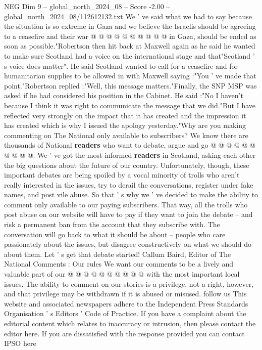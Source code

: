 \begin{textsample}{NEG Dim 9 – global\_north\_2024\_08 – Score -2.00 – global\_north\_2024\_08/112612132.txt}
We ' ve said what we had to say because the situation is so extreme in Gaza and we believe the Israelis should be agreeing to a ceasefire and their war @ @ @ @ @ @ @ @ @ @ in Gaza, should be ended as soon as possible."Robertson then hit back at Maxwell again as he said he wanted to make sure Scotland had a voice on the international stage and that"Scotland ' s voice does matter".
He said Scotland wanted to call for a ceasefire and for humanitarian supplies to be allowed in with Maxwell saying :"You ' ve made that point."Robertson replied :"Well, this message matters."Finally, the SNP MSP was asked if he had considered his position in the Cabinet.
He said :"No I haven't because I think it was right to communicate the message that we did."But I have reflected very strongly on the impact that it has created and the impression it has created which is why I issued the apology yesterday."Why are you making commenting on The National only available to subscribers?
We know there are thousands of National \textbf{readers} who want to debate, argue and go @ @ @ @ @ @ @ @ @ @.
We ' ve got the most informed \textbf{readers} in Scotland, asking each other the big questions about the future of our country.
Unfortunately, though, these important debates are being spoiled by a vocal minority of trolls who aren't really interested in the issues, try to derail the conversations, register under fake names, and post vile abuse.
So that ' s why we ' ve decided to make the ability to comment only available to our paying subscribers.
That way, all the trolls who post abuse on our website will have to pay if they want to join the debate -- and risk a permanent ban from the account that they subscribe with.
The conversation will go back to what it should be about -- people who care passionately about the issues, but disagree constructively on what we should do about them.
Let ' s get that debate started!
Callum Baird, Editor of The National Comments : Our rules We want our comments to be a lively and valuable part of our @ @ @ @ @ @ @ @ @ @ with the most important local issues.
The ability to comment on our stories is a privilege, not a right, however, and that privilege may be withdrawn if it is abused or misused. follow us This website and associated newspapers adhere to the Independent Press Standards Organisation ' s Editors ' Code of Practice.
If you have a complaint about the editorial content which relates to inaccuracy or intrusion, then please contact the editor here.
If you are dissatisfied with the response provided you can contact IPSO here

\end{textsample}

